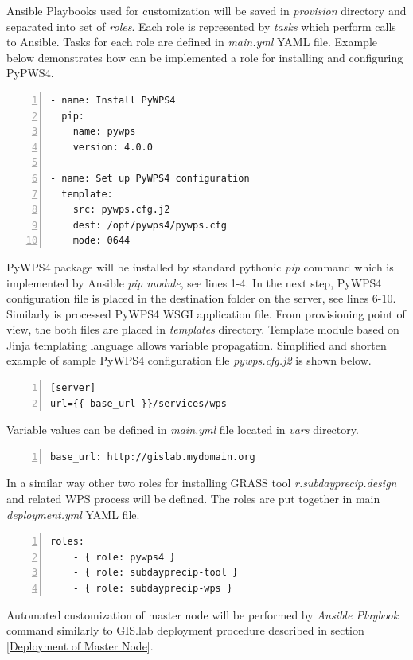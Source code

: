 \documentclass{isprs}
\begin{document}
Ansible Playbooks used for customization will be saved in
\textit{provision} directory and separated into set of
\textit{roles}. Each role is represented by \textit{tasks} which
perform calls to Ansible. Tasks for each role are defined in
\textit{main.yml} YAML file. Example below demonstrates how can be
implemented a role for installing and configuring PyPWS4.

\begin{lstlisting}[numbers=left,xleftmargin=1em]
- name: Install PyWPS4
  pip:
    name: pywps
    version: 4.0.0

- name: Set up PyWPS4 configuration
  template:
    src: pywps.cfg.j2
    dest: /opt/pywps4/pywps.cfg
    mode: 0644
\end{lstlisting}

PyWPS4 package will be installed by standard pythonic \textit{pip}
command which is implemented by Ansible \textit{pip module}, see lines
1-4. In the next step, PyWPS4 configuration file is placed in the
destination folder on the server, see lines 6-10. Simi\-larly is
processed PyWPS4 WSGI application file. From provisioning point of view,
the both files are placed in \textit{templates} directory. Template
module based on Jinja templating language allows variable
propagation. Simplified and shorten example of sample PyWPS4
configuration file \textit{pywps.cfg.j2} is shown below.

\begin{lstlisting}[numbers=left,xleftmargin=1em]
[server]
url={{ base_url }}/services/wps
\end{lstlisting}

Variable values can be defined in \textit{main.yml} file located in
\textit{vars} directory.

\begin{lstlisting}[numbers=left,xleftmargin=1em]
base_url: http://gislab.mydomain.org
\end{lstlisting}

In a similar way other two roles for installing GRASS tool
\textit{r.subdayprecip.design} and related WPS process will be
defined. The roles are put together in main \textit{deployment.yml}
YAML file.

\begin{lstlisting}[numbers=left,xleftmargin=1em]
roles:
    - { role: pywps4 }
    - { role: subdayprecip-tool }
    - { role: subdayprecip-wps }
\end{lstlisting}

Automated customization of master node will be performed by
\textit{Ansible Playbook} command similarly to GIS.lab deployment
procedure described in section \ref{Deployment of Master Node}.
\end{document}
